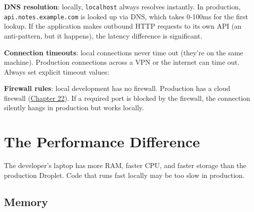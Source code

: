 \noindent{}\textbf{DNS resolution}: locally, \texttt{localhost} always resolves instantly. In production, \texttt{api.notes.example.com} is looked up via DNS, which takes 0-100ms for the first lookup. If the application makes outbound HTTP requests to its own API (an anti-pattern, but it happens), the latency difference is significant.

\textbf{Connection timeouts}: local connections never time out (they're on the same machine). Production connections across a VPN or the internet can time out. Always set explicit timeout values:

\begin{codebox}[short]

\begin{Shaded}
\begin{Highlighting}[]
\NormalTok{)}

\OperatorTok{=}\NormalTok{)}
\end{Highlighting}
\end{Shaded}

\end{codebox}

\noindent{}\textbf{Firewall rules}: local development has no firewall. Production has a cloud firewall (\hyperref[ch:22-network-configuration]{Chapter 22}). If a required port is blocked by the firewall, the connection silently hangs in production but works locally.

\setcounter{section}{4}
\section{The Performance Difference}\label{39-local-vs-production:395-the-performance-difference}

The developer's laptop has more RAM, faster CPU, and faster storage than the production Droplet. Code that runs fast locally may be too slow in production.

\subsection*{Memory}\label{39-local-vs-production:memory}


